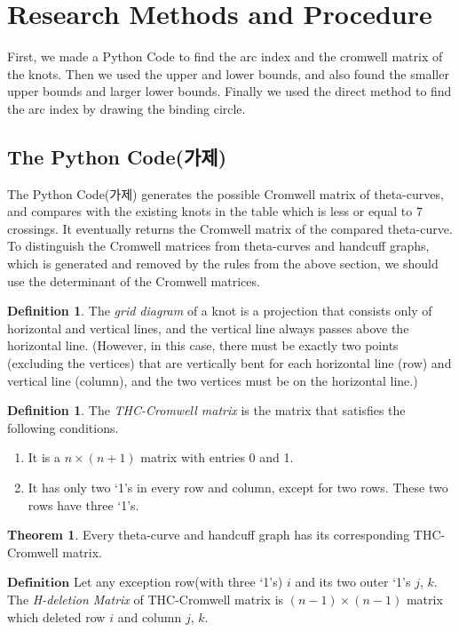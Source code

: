 \documentclass{article}
\theoremstyle{definition}
\newtheorem{defn}[thm]{Definition}
\theoremstyle{theorem}
\newtheorem{theorem}{Theorem}
\theoremstyle{proposition}
\theoremstyle{corollary}
\begin{document}
\section{Research Methods and Procedure}
First, we made a Python Code to find the arc index and the cromwell matrix of the knots. Then we used the upper and lower bounds, and also found the smaller upper bounds and larger lower bounds. Finally we used the direct method to find the arc index by drawing the binding circle.

\subsection{The Python Code(가제)}
The Python Code(가제) generates the possible Cromwell matrix of theta-curves, and compares with the existing knots in the table which is less or equal to 7 crossings.
It eventually returns the Cromwell matrix of the compared theta-curve.
To distinguish the Cromwell matrices from theta-curves and handcuff graphs, which is generated and removed by the rules from the above section, we should use the determinant of the Cromwell matrices.\\

\begin{defn}
The \textit{grid diagram} of a knot is a projection that consists only of horizontal and vertical lines, and the vertical line always passes above the horizontal line. (However, in this case, there must be exactly two points (excluding the vertices) that are vertically bent for each horizontal line (row) and vertical line (column), and the two vertices must be on the horizontal line.)
\end{defn}
\begin{defn}
The \textit{THC-Cromwell matrix} is the matrix that satisfies the following conditions.
\end{defn}
\begin{enumerate}
    \item It is a $n\times(n+1)$ matrix with entries 0 and 1.
    \item It has only two `1's in every row and column, except for two rows. These two rows have three `1's.
\end{enumerate}
\begin{theorem}
Every theta-curve and handcuff graph has its corresponding THC-Cromwell matrix.
\end{theorem}
$\mathbf{Definition}$ Let any exception row(with three `1's) $i$ and its two outer `1's $j$, $k$. The \textit{H-deletion Matrix} of THC-Cromwell matrix is $(n-1)\times(n-1)$ matrix which deleted row $i$ and column $j$, $k$.\\
\end{document}
